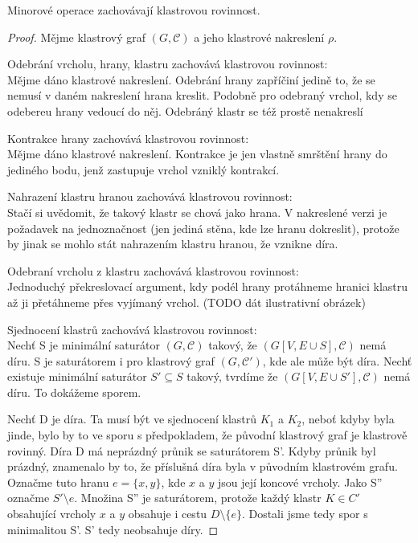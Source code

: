 \begin{tvr}
Minorové operace zachovávají klastrovou rovinnost.
\end{tvr}
\begin{proof}

Mějme klastrový graf $(G, \mathcal C)$ a jeho klastrové nakreslení $\rho$.

Odebrání vrcholu, hrany, klastru zachovává klastrovou rovinnost:\\
Mějme dáno klastrové nakreslení. Odebrání hrany zapříčiní jedině to, že se nemusí v daném nakreslení hrana kreslit. Podobně pro odebraný vrchol, kdy se odebereu hrany vedoucí do něj. Odebráný klastr se též prostě nenakreslí

Kontrakce hrany zachovává klastrovou rovinnost:\\
Mějme dáno klastrové nakreslení. Kontrakce je jen vlastně smrštění hrany do jediného bodu, jenž zastupuje vrchol vzniklý kontrakcí.

Nahrazení klastru hranou zachovává klastrovou rovinnost:\\
Stačí si uvědomit, že takový klastr se chová jako hrana. V nakreslené verzi je požadavek na jednoznačnost (jen jediná stěna, kde lze hranu dokreslit), protože by jinak se mohlo stát nahrazením klastru hranou, že vznikne díra.  

Odebraní vrcholu z klastru zachovává klastrovou rovinnost:\\
Jednoduchý překreslovací argument, kdy podél hrany protáhneme hranici klastru až ji přetáhneme přes vyjímaný vrchol. (TODO dát ilustrativní obrázek)

Sjednocení klastrů zachovává klastrovou rovinnost:\\
Nechť S je minimální saturátor $(G,\mathcal C)$ takový, že $(G[V,E \cup S],\mathcal C)$ nemá díru. S je saturátorem i pro klastrový graf $(G, \mathcal C')$, kde ale může být díra.
Nechť existuje minimální saturátor $S' \subseteq S$ takový, tvrdíme že  $(G[V,E \cup S'],\mathcal C)$ nemá díru. To dokážeme sporem.

Nechť D je díra. Ta musí být ve sjednocení klastrů $K_1$ a $K_2$, neboť kdyby byla jinde, bylo by to ve sporu s předpokladem, že původní klastrový graf je klastrově rovinný.
Díra D má neprázdný průnik se saturátorem S'. Kdyby průnik byl prázdný, znamenalo by to, že příslušná díra byla v původním klastrovém grafu. Označme tuto hranu $e = \{x,y\}$, kde $x$ a $y$ jsou její koncové vrcholy.
Jako S'' označme $S' \setminus e$. Množina S'' je saturátorem, protože každý klastr $K \in C'$ obsahující vrcholy  $x$ a $y$ obsahuje i cestu $D \setminus \{e\}$. Dostali jsme tedy spor s minimalitou S'. S' tedy neobsahuje díry.
\end{proof}

